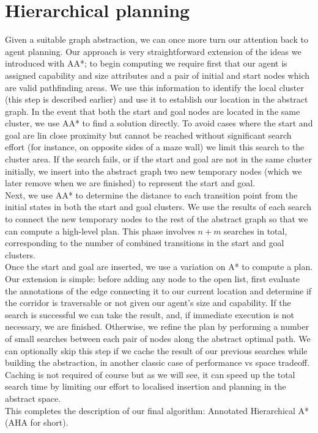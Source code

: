 \section{Hierarchical planning}
Given a suitable graph abstraction, we can once more turn our attention back to agent planning. Our approach is very straightforward extension of the ideas we introduced with AA*; to begin computing we require first that our agent is assigned capability and size attributes and a pair of initial and start nodes which are valid pathfinding areas. 
We use this information to identify the local cluster (this step is described earlier) and use it to establish our location in the abstract graph. In the event that both the start and goal nodes are located in the same cluster, we use AA* to find a solution directly. To avoid cases where the start and goal are lin close proximity but cannot be reached without significant search effort (for instance, on opposite sides of a maze wall) we limit this search to the cluster area. If the search fails, or if the start and goal are not in the same cluster initially, we insert into the abstract graph two new temporary nodes (which we later remove when we are finished) to represent the start and goal. \\ \newline
Next, we use AA* to determine the distance to each transition point from the initial states in both the start and goal clusters. We use the results of each search to connect the new temporary nodes to the rest of the abstract graph so that we can compute a high-level plan. This phase involves $n+m$ searches in total, corresponding to the number of combined transitions in the start and goal clusters.\\ \newline
Once the start and goal are inserted, we use a variation on A* to compute a plan. Our extension is simple: before adding any node to the open list, first evaluate the annotations of the edge connecting it to our current location and determine if the corridor is traversable or not given our agent's size and capability.
If the search is successful we can take the result, and, if immediate execution is not necessary, we are finished. Otherwise, we refine the plan by performing a number of small searches between each pair of nodes along the abstract optimal path. We can optionally skip this step if we cache the result of our previous searches while building the abstraction, in another classic case of performance vs space tradeoff. Caching is not required of course but as we will see, it can speed up the total search time by limiting our effort to localised insertion and planning in the abstract space. \\ \newline 
This completes the description of our final algorithm: Annotated Hierarchical A* (AHA for short).
